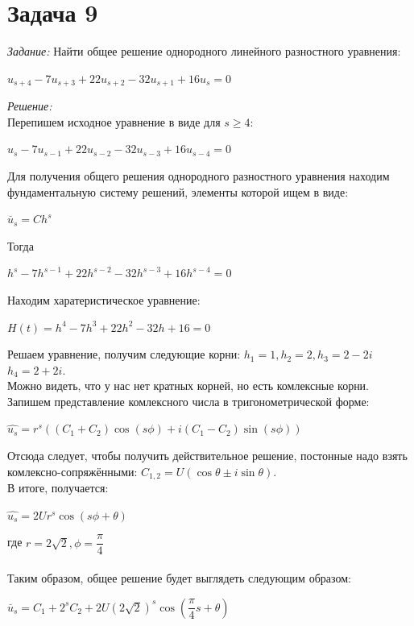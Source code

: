 \documentclass[14pt,fleqn]{extarticle}
\begin{document}
	\section*{Задача 9}
	\textit{Задание:} Найти общее решение однородного линейного разностного уравнения:
	\begin{center}
		$u_{s+4} - 7u_{s+3} + 22u_{s+2} - 32u_{s+1} + 16u_s = 0$
	\end{center}

	\textit{Решение:}\\
	Перепишем исходное уравнение в виде для $s \geq 4$:
	\begin{center}
		$u_{s} - 7u_{s-1} + 22u_{s-2} - 32u_{s-3} + 16u_{s-4} = 0$
	\end{center}
	Для получения общего решения однородного разностного уравнения находим фундаментальную систему решений, элементы которой ищем в виде:
	\begin{center}
		$\breve{u_s} = Ch^s$
	\end{center}
	Тогда
	\begin{center}
		$h^s - 7h^{s-1} + 22h^{s-2} - 32h^{s-3} + 16h^{s-4} = 0$
	\end{center}
	Находим харатеристическое уравнение:
	\begin{center}
		$H(t) = h^4 - 7h^3 + 22h^2 - 32h + 16 = 0$
	\end{center}
	Решаем уравнение, получим следующие корни: $h_1 = 1, h_2 = 2, h_3 = 2-2i$\\$h_4 = 2+2i$.\\
	Можно видеть, что у нас нет кратных корней, но есть комлексные корни. Запишем представление комлексного числа в тригонометрической форме:
	\begin{center}
		$\hat{u_s} = r^s((C_1+C_2)\cos(s\phi)+i(C_1-C_2)\sin(s\phi))$
	\end{center}
	Отсюда следует, чтобы получить действительное решение, постонные надо взять комлексно-сопряжёнными: $C_{1,2} = U(\cos\theta \pm i\sin\theta)$.\\
	В итоге, получается:
	\begin{center}
		$\hat{u_s} = 2Ur^s\cos(s\phi+\theta)$
	\end{center}
	где $r = 2\sqrt{2}, \phi = \dfrac{\pi}{4}$\\\\
	Таким образом, общее решение будет выглядеть следующим образом:
	\begin{center}
		$\breve{u_s} = C_1 + 2^sC_2 + 2U(2\sqrt{2})^s\cos(\dfrac{\pi}{4}s+\theta)$
	\end{center}
\end{document}
